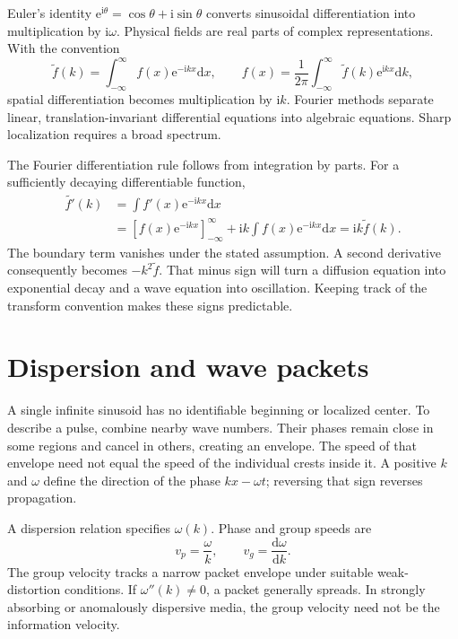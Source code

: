 \documentclass[11pt,oneside]{book}
\newcommand{\dd}{\mathrm{d}}
\newcommand{\ii}{\mathrm{i}}
\newcommand{\ee}{\mathrm{e}}
\newcommand{\od}[2]{\frac{\dd #1}{\dd #2}}
\theoremstyle{reviewstyle}
\begin{document}
Euler's identity $\ee^{\ii\theta}=\cos\theta+\ii\sin\theta$ converts sinusoidal differentiation into multiplication by $\ii\omega$. Physical fields are real parts of complex representations. With the convention
\begin{equation}
\widetilde f(k)=\int_{-\infty}^{\infty}f(x)\ee^{-\ii kx}\dd x,
\qquad
f(x)=\frac{1}{2\pi}\int_{-\infty}^{\infty}\widetilde f(k)\ee^{\ii kx}\dd k,
\end{equation}
spatial differentiation becomes multiplication by $\ii k$. Fourier methods separate linear, translation-invariant differential equations into algebraic equations. Sharp localization requires a broad spectrum.

The Fourier differentiation rule follows from integration by parts. For a sufficiently decaying differentiable function,
\begin{align}
\widetilde{f'}(k)
&=\int f'(x)\ee^{-\ii kx}\dd x\\
&=\left[f(x)\ee^{-\ii kx}\right]_{-\infty}^{\infty}
+\ii k\int f(x)\ee^{-\ii kx}\dd x
=\ii k\widetilde f(k).
\end{align}
The boundary term vanishes under the stated assumption. A second derivative consequently becomes $-k^2\widetilde f$. That minus sign will turn a diffusion equation into exponential decay and a wave equation into oscillation. Keeping track of the transform convention makes these signs predictable.

\section{Dispersion and wave packets}
A single infinite sinusoid has no identifiable beginning or localized center. To describe a pulse, combine nearby wave numbers. Their phases remain close in some regions and cancel in others, creating an envelope. The speed of that envelope need not equal the speed of the individual crests inside it. A positive $k$ and $\omega$ define the direction of the phase $kx-\omega t$; reversing that sign reverses propagation.

A dispersion relation specifies $\omega(k)$. Phase and group speeds are
\begin{equation}
v_p=\frac{\omega}{k},\qquad v_g=\od{\omega}{k}.
\end{equation}
The group velocity tracks a narrow packet envelope under suitable weak-distortion conditions. If $\omega''(k)\neq0$, a packet generally spreads. In strongly absorbing or anomalously dispersive media, the group velocity need not be the information velocity.
\end{document}

